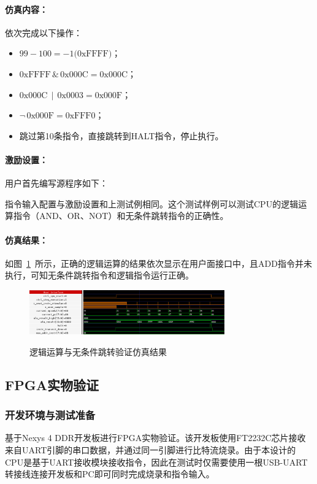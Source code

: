 \documentclass[lang=cn,a4paper,newtx]{elegantpaper}
\begin{document}
\paragraph{仿真内容：}
依次完成以下操作：
\begin{itemize}
  \item $99 - 100 = -1 \text{(0xFFFF)}$；
  \item $\text{0xFFFF} \,\&\, \text{0x000C} = \text{0x000C}$；
  \item $\text{0x000C} \,\mid\, \text{0x0003} = \text{0x000F}$；
  \item $\neg\, \text{0x000F} = \text{0xFFF0}$；
  \item 跳过第10条指令，直接跳转到HALT指令，停止执行。
\end{itemize}



\paragraph{激励设置：}

用户首先编写源程序如下：


指令输入配置与激励设置和上测试例相同。这个测试样例可以测试CPU的逻辑运算指令（AND、OR、NOT）和无条件跳转指令的正确性。

\paragraph{仿真结果：}
如图~\ref{fig:sim:4}~所示，正确的逻辑运算的结果依次显示在用户面接口中，且ADD指令并未执行，可知无条件跳转指令和逻辑指令运行正确。

\begin{figure}[htbp]
  \centering
  \caption{逻辑运算与无条件跳转验证仿真结果}
  \includegraphics[width = 0.75\textwidth]{figure/cpu_sim_logic.png}
  \label{fig:sim:4}
\end{figure}

\subsection{FPGA实物验证}
\subsubsection{开发环境与测试准备}
基于Nexys 4 DDR开发板进行FPGA实物验证。该开发板使用FT2232C芯片接收来自UART引脚的串口数据，并通过同一引脚进行比特流烧录。由于本设计的CPU是基于UART接收模块接收指令，因此在测试时仅需要使用一根USB-UART转接线连接开发板和PC即可同时完成烧录和指令输入。
\end{document}
